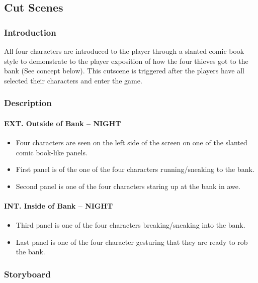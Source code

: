 \documentclass[10pt]{report}
\begin{document}
\subsection{Cut Scenes}

\subsubsection{Introduction}

All four characters are introduced to the player through a slanted comic book style to demonstrate to the player exposition of how the four thieves got to the bank (See concept below). This cutscene is triggered after the players have all selected their characters and enter the game.

\subsubsection{Description}

\paragraph{EXT. Outside of Bank -- NIGHT} \mbox \\
\begin{itemize}
    \item Four characters are seen on the left side of the screen on one of the slanted comic book-like panels. 
    \item First panel is of the one of the four characters running/sneaking to the bank.
    \item Second panel is one of the four characters staring up at the bank in awe.
\end{itemize}
\paragraph{INT. Inside of Bank -- NIGHT} \mbox \\
\begin{itemize}
    \item Third panel is one of the four characters breaking/sneaking into the bank.
    \item Last panel is one of the four character gesturing that they are ready to rob the bank.
\end{itemize}

\subsubsection{Storyboard}
\end{document}
